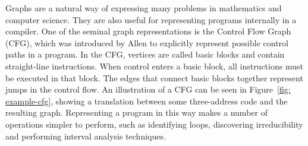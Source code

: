 Graphs are a natural way of expressing many problems in mathematics and computer science. They are also useful for representing programs internally in a compiler. One of the seminal graph representations is the Control Flow Graph (CFG), which was introduced by Allen \cite{808479} to explicitly represent possible control paths in a program. In the CFG, vertices are called basic blocks and contain straight-line instructions. When control enters a basic block, all instructions must be executed in that block. The edges that connect basic blocks together represent jumps in the control flow. An illustration of a CFG can be seen in Figure~\ref{fig: example-cfg}, showing a translation between some three-address code and the resulting graph. Representing a program in this way makes a number of operations simpler to perform, such as identifying loops, discovering irreducibility and performing interval analysis techniques.

